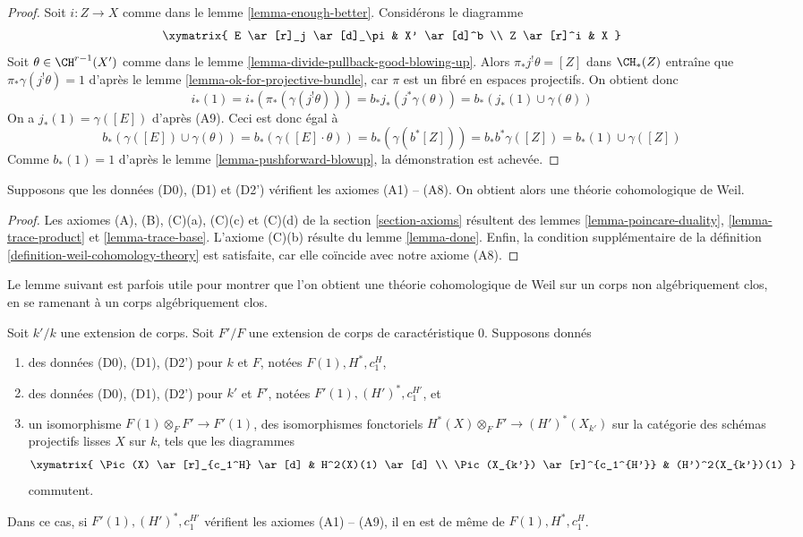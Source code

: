 \begin{proof}
Soit $i : Z \to X$ comme dans le lemme \ref{lemma-enough-better}. Considérons
le diagramme
$$
\xymatrix{
E \ar[r]_j \ar[d]_\pi & X' \ar[d]^b \\
Z \ar[r]^i & X
}
$$
Soit $\theta \in \CH^{r - 1}(X')$ comme dans le
lemme \ref{lemma-divide-pullback-good-blowing-up}.
Alors $\pi_*j^!\theta = [Z]$ dans $\CH_*(Z)$ entraîne que
$\pi_*\gamma(j^!\theta) = 1$ d'après le lemme \ref{lemma-ok-for-projective-bundle},
car $\pi$ est un fibré en espaces projectifs.
On obtient donc
$$
i_*(1) = i_*(\pi_*(\gamma(j^!\theta))) =
b_*j_*(j^*\gamma(\theta)) =
b_*(j_*(1) \cup \gamma(\theta))
$$
On a $j_*(1) = \gamma([E])$ d'après (A9). Ceci est donc égal à
$$
b_*(\gamma([E]) \cup \gamma(\theta)) =
b_*(\gamma([E] \cdot \theta)) =
b_*(\gamma(b^*[Z])) =
b_*b^*\gamma([Z]) = b_*(1) \cup \gamma([Z])
$$
Comme $b_*(1) = 1$ d'après le lemme \ref{lemma-pushforward-blowup}, la
démonstration est achevée.
\end{proof}

\begin{proposition}
\label{proposition-get-weil}
Supposons que les données (D0), (D1) et (D2') vérifient les axiomes (A1) -- (A8).
On obtient alors une théorie cohomologique de Weil.
\end{proposition}

\begin{proof}
Les axiomes (A), (B), (C)(a), (C)(c) et (C)(d) de la
section \ref{section-axioms} résultent des
lemmes \ref{lemma-poincare-duality}, \ref{lemma-trace-product} et
\ref{lemma-trace-base}.
L'axiome (C)(b) résulte du
lemme \ref{lemma-done}.
Enfin, la condition supplémentaire de la
définition \ref{definition-weil-cohomology-theory}
est satisfaite, car elle coïncide avec notre axiome (A8).
\end{proof}

\noindent
Le lemme suivant est parfois utile pour montrer que l'on obtient une
théorie cohomologique de Weil sur un corps non algébriquement clos, en se
ramenant à un corps algébriquement clos.

\begin{lemma}
\label{lemma-check-over-extension}
Soit $k'/k$ une extension de corps. Soit $F'/F$ une extension
de corps de caractéristique $0$. Supposons donnés
\begin{enumerate}
\item des données (D0), (D1), (D2') pour $k$ et $F$, notées
$F(1), H^*, c_1^H$,
\item des données (D0), (D1), (D2') pour $k'$ et $F'$, notées
$F'(1), (H')^*, c_1^{H'}$, et
\item un isomorphisme $F(1) \otimes_F F' \to F'(1)$, des isomorphismes fonctoriels
$H^*(X) \otimes_F F' \to (H')^*(X_{k'})$ sur la catégorie des schémas projectifs lisses
$X$ sur $k$, tels que les diagrammes
$$
\xymatrix{
\Pic(X) \ar[r]_{c_1^H} \ar[d] & H^2(X)(1) \ar[d] \\
\Pic(X_{k'}) \ar[r]^{c_1^{H'}} & (H')^2(X_{k'})(1)
}
$$
commutent.
\end{enumerate}
Dans ce cas, si $F'(1), (H')^*, c_1^{H'}$ vérifient les axiomes (A1) -- (A9),
il en est de même de $F(1), H^*, c_1^H$.
\end{lemma}

